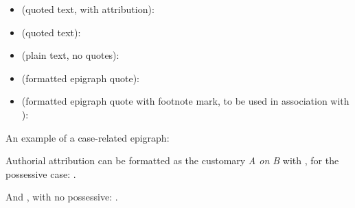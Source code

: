\begin{itemize}\item {} (quoted text, with attribution):\end{itemize} \begin{myquotation}\end{myquotation}
\begin{itemize}\item{} (quoted text):\end{itemize} \begin{myquotation}\end{myquotation}
\begin{itemize}\item{} (plain text, no quotes): \end{itemize}\begin{myquotation}\end{myquotation}
\begin{itemize}\item{} (formatted epigraph quote): \end{itemize}\begin{myquotation}\end{myquotation}
\begin{itemize}\item{} (formatted epigraph quote with footnote mark, to be used in association with ):\end{itemize} \begin{myquotation}\end{myquotation}

\p {} An example of a case-related epigraph: \begin{myquotation}\end{myquotation}

\p {} Authorial attribution can be formatted as the customary \textit{A on B} with , for the possessive case: .

\p And , with no possessive: .

